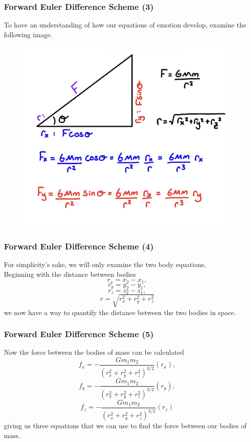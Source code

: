 \documentclass{beamer}
\begin{document}
\begin{frame}
\frametitle{Forward Euler Difference Scheme (3)}
To have an understanding of how our equations of emotion develop, examine the following image.
\begin{figure}[htbp]
\begin{center}
\includegraphics[width=0.75\linewidth]{ForceDiagram.png}
\end{center}
\end{figure}
\end{frame}
\begin{frame}
\frametitle{Forward Euler Difference Scheme (4)}
For simplicity's sake, we will only examine the two body equations.
\\
\vspace{10pt}
Beginning with the distance between bodies
\begin{equation*}
r_x=x_{2}-x_{1},
\end{equation*}
\begin{equation*}
r_y=y_{2}-y_{1}, 
\end{equation*}
\begin{equation*}
r_z=z_{2}-z_{1},
\end{equation*}
\begin{equation*}
r=\sqrt{r_x^2+r_y^2+r_z^2}
\end{equation*}
we now have a way to quantify the distance between the two bodies in space.
\end{frame}
\begin{frame}
\frametitle{Forward Euler Difference Scheme (5)}
Now the force between the bodies of mass can be calculated
\begin{equation*}
f_x=-\frac{Gm_{1}m_{2}}{(r_{x}^2+r_{y}^2+r_{z}^2)^{3/2}}(r_x),
\end{equation*}
\begin{equation*}
f_y=-\frac{Gm_{1}m_{2}}{(r_{x}^2+r_{y}^2+r_{z}^2)^{3/2}}(r_y),
\end{equation*}
\begin{equation*}
f_z=-\frac{Gm_{1}m_{2}}{(r_{x}^2+r_{y}^2+r_{z}^2)^{3/2}}(r_z)
\end{equation*}
giving us three equations that we can use to find the force between our bodies of mass.
\end{frame}
\end{document}
